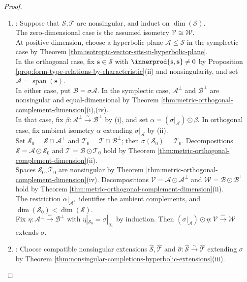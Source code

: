 \begin{theorem}
\begin{proof}
\begin{enumerate}[label=(\roman*)]
\item {}: Suppose that $\mathcal{S},\mathcal{T}$ are nonsingular, and induct on $\dim(\mathcal{S})$.\\
The zero-dimensional case is the assumed isometry $\mathcal{V}\cong\mathcal{W}$.\\
At positive dimension, choose a hyperbolic plane $\mathcal{A}\leq\mathcal{S}$ in the symplectic case by Theorem \ref{thm:isotropic-vector-sits-in-hyperbolic-plane}.\\
In the orthogonal case, fix $\mathbf{s}\in\mathcal{S}$ with $\innerprod{\mathbf{s},\mathbf{s}}\neq0$ by Proposition \ref{prop:form-type-relations-by-characteristic}(ii) and nonsingularity, and set $\mathcal{A}=\operatorname{span}(\mathbf{s})$.\\
In either case, put $\mathcal{B}=\sigma\mathcal{A}$. In the symplectic case, $\mathcal{A}^{\perp}$ and $\mathcal{B}^{\perp}$ are nonsingular and equal-dimensional by Theorem \ref{thm:metric-orthogonal-complement-dimension}(i),(iv).\\
In that case, fix $\beta:\mathcal{A}^{\perp}\xrightarrow{\sim}\mathcal{B}^{\perp}$ by (i), and set $\alpha=(\sigma|_{\mathcal{A}})\odot\beta$. In orthogonal case, fix ambient isometry $\alpha$ extending $\sigma|_{\mathcal{A}}$ by (ii).\\
Set $\mathcal{S}_0=\mathcal{S}\cap\mathcal{A}^{\perp}$ and $\mathcal{T}_0=\mathcal{T}\cap\mathcal{B}^{\perp}$; then $\sigma(\mathcal{S}_0)=\mathcal{T}_0$. Decompositions $\mathcal{S}=\mathcal{A}\odot\mathcal{S}_0$ and $\mathcal{T}=\mathcal{B}\odot\mathcal{T}_0$ hold by Theorem \ref{thm:metric-orthogonal-complement-dimension}(ii).\\
Spaces $\mathcal{S}_0,\mathcal{T}_0$ are nonsingular by Theorem \ref{thm:metric-orthogonal-complement-dimension}(iv). Decompositions $\mathcal{V}=\mathcal{A}\odot\mathcal{A}^{\perp}$ and $\mathcal{W}=\mathcal{B}\odot\mathcal{B}^{\perp}$ hold by Theorem \ref{thm:metric-orthogonal-complement-dimension}(ii).\\
The restriction $\alpha|_{\mathcal{A}^{\perp}}$ identifies the ambient complements, and $\dim(\mathcal{S}_0)<\dim(\mathcal{S})$.\\
Fix $\eta:\mathcal{A}^{\perp}\xrightarrow{\sim}\mathcal{B}^{\perp}$ with $\eta|_{\mathcal{S}_0}=\sigma|_{\mathcal{S}_0}$ by induction. Then $(\sigma|_{\mathcal{A}})\odot\eta:\mathcal{V}\xrightarrow{\sim}\mathcal{W}$ extends $\sigma$.
\item {}: Choose compatible nonsingular extensions $\widehat{\mathcal{S}},\widehat{\mathcal{T}}$ and $\widehat{\sigma}:\widehat{\mathcal{S}}\xrightarrow{\sim}\widehat{\mathcal{T}}$ extending $\sigma$ by Theorem \ref{thm:nonsingular-completions-hyperbolic-extensions}(iii).\\

\end{enumerate}
\end{proof}
\end{theorem}
